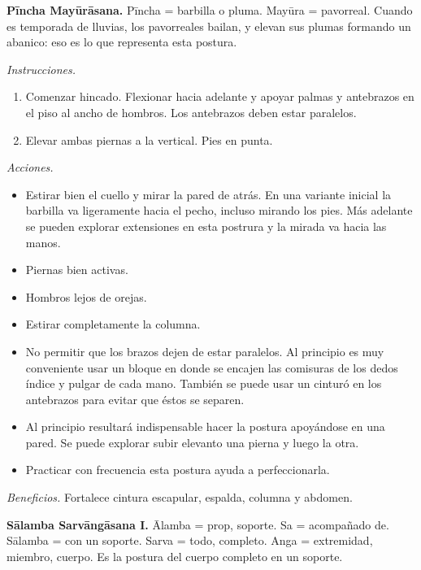 \medskip\noindent\textbf{Pīncha Mayūrāsana.}
Pīncha = barbilla o pluma. Mayūra =
pavorreal. Cuando es temporada de lluvias,
los pavorreales bailan, y elevan sus plumas
formando un abanico: eso es lo que representa
esta postura.

\emph{Instrucciones.}
\begin{enumerate}
\item Comenzar hincado. Flexionar hacia
adelante y apoyar palmas y antebrazos en el
piso al ancho de hombros. Los antebrazos
deben estar paralelos.
\item Elevar ambas piernas a la vertical.
Pies en punta.
\end{enumerate}

\emph{Acciones.}
\begin{itemize}
\item Estirar bien el cuello y mirar la pared
de atrás. En una variante inicial la barbilla
va ligeramente hacia el pecho, incluso
mirando los pies. Más adelante se pueden
explorar extensiones en esta postrura y la
mirada va hacia las manos.
\item Piernas bien activas.
\item Hombros lejos de orejas.
\item Estirar completamente la columna.
\item No permitir que los brazos dejen de
estar paralelos. Al principio es muy
conveniente usar un bloque en donde se
encajen las comisuras de los dedos índice y
pulgar de cada mano. También se puede usar un
cinturó en los antebrazos para evitar que
éstos se separen.
\item Al principio resultará indispensable
hacer la postura apoyándose en una pared. Se
puede explorar subir elevanto una pierna y
luego la otra.
\item Practicar con frecuencia esta postura
ayuda a perfeccionarla.
\end{itemize}

\emph{Beneficios.} Fortalece cintura
escapular, espalda, columna y abdomen.

\medskip\noindent\textbf{Sālamba Sarvāngāsana
I.}
Ālamba = prop, soporte. Sa = acompañado de.
Sālamba = con un soporte. Sarva = todo,
completo. Anga = extremidad, miembro, cuerpo.
Es la postura del cuerpo completo en un
soporte.

